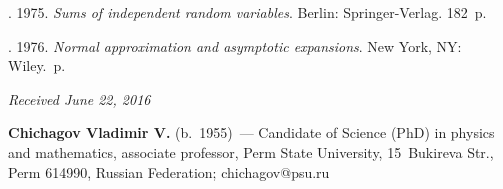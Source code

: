 \begin{multicols}{2}
{{\begin{thebibliography}{9}
. 1975. \textit{Sums of independent random variables}. 
Berlin: Springer-Verlag. 182~p.



. 
1976. \textit{Normal approximation and asymptotic expansions}. New York, NY: Wiley.~p.

   \end{thebibliography}

 }
 }
 


\end{multicols}

\vspace*{-7pt}

\hfill{\small\textit{Received June 22, 2016}}

\vspace*{-20pt}

\Contrl

\noindent
\textbf{Chichagov Vladimir V.} (b.\ 1955)~---
 Candidate of Science (PhD) in physics and mathematics, associate professor, 
 Perm State University, 15~Bukireva Str., Perm 614990, 
 Russian Federation; \mbox{chichagov@psu.ru}
\label{end\stat}


\renewcommand{\bibname}{\protect\rm Литература}